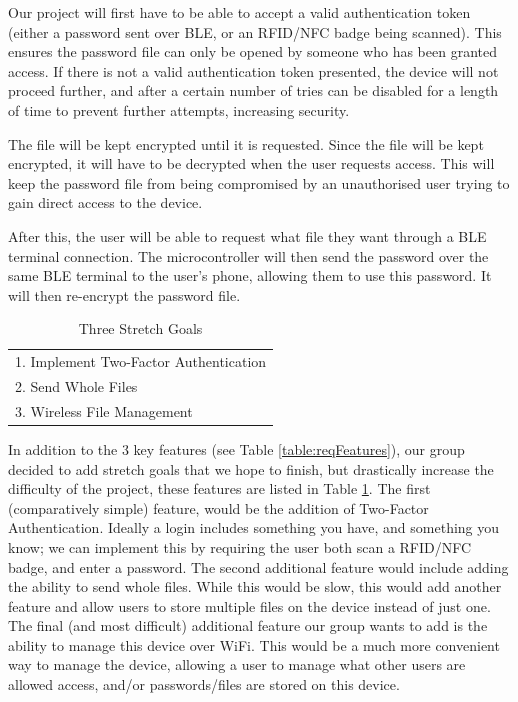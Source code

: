 \documentclass[12pt]{article}
\begin{document}
Our project will first have to be able to accept a valid authentication token (either a password sent over BLE, or an RFID/NFC badge being scanned). This ensures the password file can only be opened by someone who has been granted access. If there is not a valid authentication token presented, the device will not proceed further, and after a certain number of tries can be disabled for a length of time to prevent further attempts, increasing security.

The file will be kept encrypted until it is requested. Since the file will be kept encrypted, it will have to be decrypted when the user requests access. This will keep the password file from being compromised by an unauthorised user trying to gain direct access to the device.

After this, the user will be able to request what file they want through a BLE terminal connection. The microcontroller will then send the password over the same BLE terminal to the user's phone, allowing them to use this password. It will then re-encrypt the password file.

\begin{table}[ht]
    \caption{Three Stretch Goals}
    \label{table:optFeatures}
    \begin{center}
        \begin{tabular}{|l|}
            \hline
            1. Implement Two-Factor Authentication \\
            2. Send Whole Files \\
            3. Wireless File Management \\
            \hline
        \end{tabular}
    \end{center}
\end{table}

In addition to the 3 key features (see Table \ref{table:reqFeatures}), our group decided to add stretch goals that we hope to finish, but drastically increase the difficulty of the project, these features are listed in Table \ref{table:optFeatures}. The first (comparatively simple) feature, would be the addition of Two-Factor Authentication. Ideally a login includes something you have, and something you know; we can implement this by requiring the user both scan a RFID/NFC badge, and enter a password. The second additional feature would include adding the ability to send whole files. While this would be slow, this would add another feature and allow users to store multiple files on the device instead of just one. The final (and most difficult) additional feature our group wants to add is the ability to manage this device over WiFi. This would be a much more convenient way to manage the device, allowing a user to manage what other users are allowed access, and/or passwords/files are stored on this device.
\end{document}

